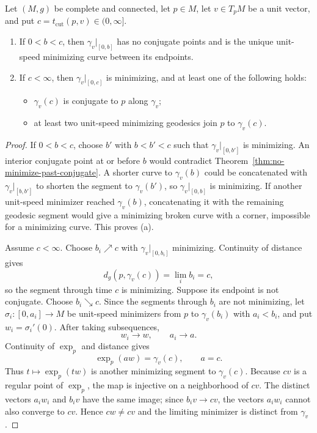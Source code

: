 \begin{proposition}
\label{prop:properties-of-cut-times}
Let $(M,g)$ be complete and connected, let $p\in M$, let
$v\in T_pM$ be a unit vector, and put
$c=t_{\mathrm{cut}}(p,v)\in(0,\infty]$.
\begin{enumerate}
\item[(a)] If $0<b<c$, then $\gamma_v|_{[0,b]}$ has no conjugate points and
is the unique unit-speed minimizing curve between its endpoints.
\item[(b)] If $c<\infty$, then $\gamma_v|_{[0,c]}$ is minimizing, and at
least one of the following holds:
\begin{itemize}
\item $\gamma_v(c)$ is conjugate to $p$ along $\gamma_v$;
\item at least two unit-speed minimizing geodesics join $p$ to $\gamma_v(c)$.
\end{itemize}
\end{enumerate}

\begin{proof}
\sketch If $0<b<c$, choose $b'$ with $b<b'<c$ such that
$\gamma_v|_{[0,b']}$ is minimizing. An interior conjugate point at or before
$b$ would contradict
Theorem~\ref{thm:no-minimize-past-conjugate}. A shorter curve to
$\gamma_v(b)$ could be concatenated with $\gamma_v|_{[b,b']}$ to shorten the
segment to $\gamma_v(b')$, so $\gamma_v|_{[0,b]}$ is minimizing. If another
unit-speed minimizer reached $\gamma_v(b)$, concatenating it with the remaining
geodesic segment would give a minimizing broken curve with a corner, impossible
for a minimizing curve. This proves (a).

Assume $c<\infty$. Choose $b_i\nearrow c$ with
$\gamma_v|_{[0,b_i]}$ minimizing. Continuity of distance gives
\[
d_g(p,\gamma_v(c))=\lim_i b_i=c,
\]
so the segment through time $c$ is minimizing. Suppose its endpoint is not
conjugate. Choose $b_i\searrow c$. Since the segments through $b_i$ are not
minimizing, let
$\sigma_i\colon[0,a_i]\to M$ be unit-speed minimizers from $p$ to
$\gamma_v(b_i)$ with $a_i<b_i$, and put $w_i=\sigma_i'(0)$. After taking
subsequences,
\[
w_i\to w,
\qquad a_i\to a.
\]
Continuity of $\exp_p$ and distance gives
\[
\exp_p(aw)=\gamma_v(c),
\qquad a=c.
\]
Thus $t\mapsto\exp_p(tw)$ is another minimizing segment to $\gamma_v(c)$.
Because $cv$ is a regular point of $\exp_p$, the map is injective on a
neighborhood of $cv$. The distinct vectors $a_iw_i$ and $b_iv$ have the same
image; since $b_iv\to cv$, the vectors $a_iw_i$ cannot also converge to $cv$.
Hence $cw\ne cv$ and the limiting minimizer is distinct from $\gamma_v$.
\end{proof}
\end{proposition}

